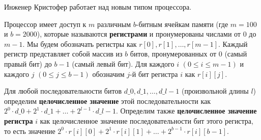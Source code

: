 Инженер Кристофер работает над новым типом процессора.

Процессор имеет доступ к $m$ различным $b$-битным ячейкам памяти (где $m = 100$ и $b=2000$), которые называются \textbf{регистрами} и пронумерованы числами от $0$ до $m-1$. Мы будем обозначать регистры как $r[0], r[1], \ldots, r[m-1]$.
Каждый регистр представляет собой массив из $b$ битов, пронумерованных от $0$ (самый правый бит) до $b-1$ (самый левый бит).
Для каждого $i$ $(0\leq i \leq m-1)$ и каждого $j$ $(0 \leq j \leq b-1)$ обозначим $j$-й бит регистра $i$ как $r[i][j]$.

Для любой последовательности битов $d\_0, d\_1, \ldots, d\_{l-1}$ (произвольной длины $l$) определим \textbf{целочисленное значение} этой последовательности как $2^0 \cdot d\_0 + 2^1 \cdot d\_1 + \ldots + 2^{l-1} \cdot d\_{l-1}$.
Определим также \textbf{целочисленное значение регистра} $i$ как целочисленное значение последовательности бит этого регистра, то есть значение $2^0 \cdot r[i][0] + 2^1 \cdot r[i][1] + \ldots + 2^{b-1} \cdot r[i][b-1]$.

